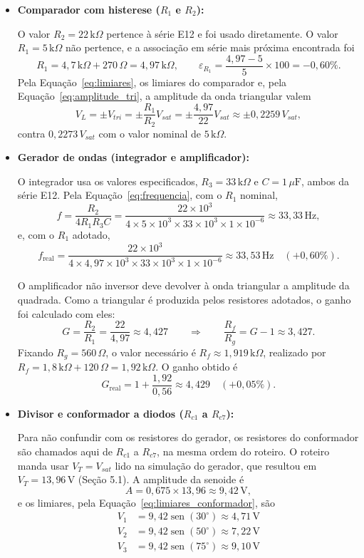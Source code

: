 \documentclass[11pt,a4paper]{article}
\begin{document}
\begin{itemize}

    \item \textbf{Comparador com histerese ($R_1$ e $R_2$):}

    O valor $R_2=22\,\text{k}\Omega$ pertence à série E12 e foi usado diretamente. O valor $R_1=5\,\text{k}\Omega$ não pertence, e a associação em série mais próxima encontrada foi
    \[
    R_1=4{,}7\,\text{k}\Omega+270\,\Omega=4{,}97\,\text{k}\Omega,
    \qquad
    \varepsilon_{R_1}=\frac{4{,}97-5}{5}\times100=-0{,}60\%.
    \]
    Pela Equação~\ref{eq:limiares}, os limiares do comparador e, pela Equação~\ref{eq:amplitude_tri}, a amplitude da onda triangular valem
    \[
    V_L=\pm V_{tri}=\pm\frac{R_1}{R_2}V_{sat}=\pm\frac{4{,}97}{22}V_{sat}\approx\pm0{,}2259\,V_{sat},
    \]
    contra $0{,}2273\,V_{sat}$ com o valor nominal de $5\,\text{k}\Omega$.

    \item \textbf{Gerador de ondas (integrador e amplificador):}

    O integrador usa os valores especificados, $R_3=33\,\text{k}\Omega$ e $C=1\,\mu\text{F}$, ambos da série E12. Pela Equação~\ref{eq:frequencia}, com o $R_1$ nominal,
    \[
    f=\frac{R_2}{4R_1R_3C}=\frac{22\times10^3}{4\times5\times10^3\times33\times10^3\times1\times10^{-6}}\approx33{,}33\,\text{Hz},
    \]
    e, com o $R_1$ adotado,
    \[
    f_{\text{real}}=\frac{22\times10^3}{4\times4{,}97\times10^3\times33\times10^3\times1\times10^{-6}}\approx33{,}53\,\text{Hz}\quad(+0{,}60\%).
    \]

    O amplificador não inversor deve devolver à onda triangular a amplitude da quadrada. Como a triangular é produzida pelos resistores adotados, o ganho foi calculado com eles:
    \[
    G=\frac{R_2}{R_1}=\frac{22}{4{,}97}\approx4{,}427
    \qquad\Rightarrow\qquad
    \frac{R_f}{R_g}=G-1\approx3{,}427.
    \]
    Fixando $R_g=560\,\Omega$, o valor necessário é $R_f\approx1{,}919\,\text{k}\Omega$, realizado por $R_f=1{,}8\,\text{k}\Omega+120\,\Omega=1{,}92\,\text{k}\Omega$. O ganho obtido é
    \[
    G_{\text{real}}=1+\frac{1{,}92}{0{,}56}\approx4{,}429\quad(+0{,}05\%).
    \]

    \item \textbf{Divisor e conformador a diodos ($R_{c1}$ a $R_{c7}$):}

    Para não confundir com os resistores do gerador, os resistores do conformador são chamados aqui de $R_{c1}$ a $R_{c7}$, na mesma ordem do roteiro. O roteiro manda usar $V_T=V_{sat}$ lido na simulação do gerador, que resultou em $V_T=13{,}96\,\text{V}$ (Seção 5.1). A amplitude da senoide é
    \[
    A=0{,}675\times13{,}96\approx9{,}42\,\text{V},
    \]
    e os limiares, pela Equação~\ref{eq:limiares_conformador}, são
    \begin{align*}
        V_1&=9{,}42\operatorname{sen}(30^\circ)\approx4{,}71\,\text{V}\\
        V_2&=9{,}42\operatorname{sen}(50^\circ)\approx7{,}22\,\text{V}\\
        V_3&=9{,}42\operatorname{sen}(75^\circ)\approx9{,}10\,\text{V}
    \end{align*}


\end{itemize}
\end{document}
